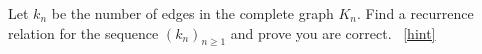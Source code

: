 \documentclass{book}
\begin{document}
\setcounter{project}{135}
\addtocounter{project}{-1}
\begin{activity}[]\label{activity-128}
\hypertarget{p-935}{}%
Let \(k_n\) be the number of edges in the complete graph \(K_n\).  Find a recurrence relation for the sequence \((k_n)_{n \ge 1}\) and prove you are correct.%
~\hfill{\tiny\hyperlink{a-135}{[hint]}\hypertarget{q-135}{}}\end{activity}
\end{document}
